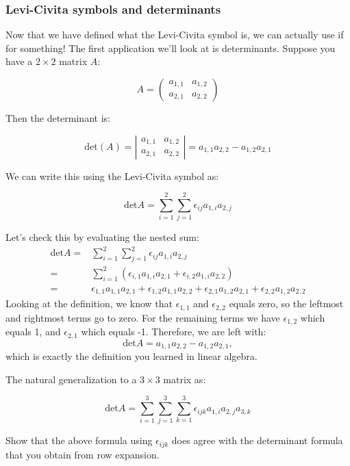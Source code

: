 \subsubsection*{Levi-Civita symbols and determinants} 
Now that we have defined what the Levi-Civita symbol is, we can actually use if for something!  The first application we'll look at is determinants.  Suppose you have a $2 \times 2 $ matrix $A$:

\[ A = \left( \begin{array}{cc}
a_{1,1} & a_{1,2} \\
a_{2,1} & a_{2,2} \end{array} \right) \]

Then the determinant is:

\[ \text{det} (A) = 
 \left| \begin{array}{cc} a_{1,1} & a_{1,2} \\
a_{2,1} & a_{2,2} \end{array} \right|
= a_{1,1}a_{2,2} - a_{1,2}a_{2,1} \]

We can write this using the Levi-Civita symbol as:

\[ \text{det} A = \sum_{i=1}^2 \sum_{j=1}^2 \epsilon_{ij} a_{1,i} a_{2,j} \]

Let's check this by evaluating the nested sum:
\begin{align}
\text{det} A =& \sum_{i=1}^2 \sum_{j=1}^2 \epsilon_{ij} a_{1,i} a_{2,j} \\
=& \sum_{i=1}^2 \left( \epsilon_{i,1} a_{1,i} a_{2,1} + \epsilon_{i,2} a_{1,i} a_{2,2} \right) \\
=& \epsilon_{1,1} a_{1,1} a_{2,1} + \epsilon_{1,2} a_{1,1} a_{2,2} + \epsilon_{2,1} a_{1,2} a_{2,1} + \epsilon_{2,2} a_{1,2} a_{2,2}
\end{align}
Looking at the definition, we know that $\epsilon_{1,1}$ and $\epsilon_{2,2}$ equals zero, so the leftmost and rightmost terms go to zero.   For the remaining terms we have $\epsilon_{1,2}$ which equals 1, and $\epsilon_{2,1}$ which equals -1.  Therefore, we are left with:
\[ \text{det} A = a_{1,1}a_{2,2} - a_{1,2}a_{2,1}, \]
which is exactly the definition you learned in linear algebra.   

The natural generalization to a $3 \times 3$ matrix as:

\[ \text{det} A = \sum_{i=1}^3 \sum_{j=1}^3 \sum_{k=1}^3 \epsilon_{ijk} a_{1,i} a_{2,j} a_{3,k} \]

\begin{exercise}{}
Show that the above formula using $\epsilon_{ijk}$ does agree with the determinant formula that you obtain from row expansion.
\end{exercise}

